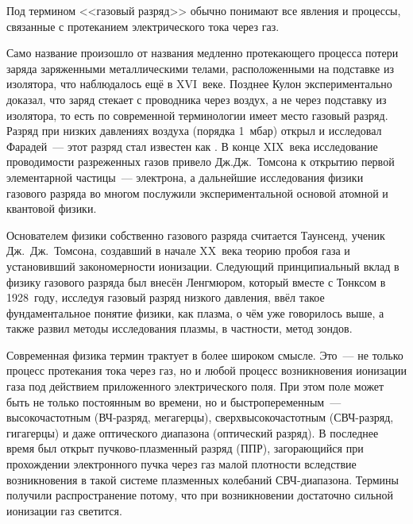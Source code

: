 

Под термином <<газовый разряд>> обычно понимают все явления и процессы, связанные с протеканием электрического тока
через газ.

Само название  произошло от названия медленно протекающего процесса потери заряда заряженными металлическими
телами, расположенными на подставке из изолятора, что наблюдалось ещё в XVI~веке. Позднее Кулон экспериментально
доказал, что заряд стекает с проводника через воздух, а не через подставку из изолятора, то есть по современной
терминологии имеет место газовый разряд. Разряд при низких давлениях воздуха (порядка 1~мбар) открыл и исследовал
Фарадей~--- этот разряд стал известен как . В конце XIX~века исследование проводимости разреженных газов
привело Дж.Дж.~Томсона к открытию первой элементарной частицы~--- электрона, а дальнейшие исследования физики газового
разряда во многом послужили экспериментальной основой атомной и квантовой физики.

Основателем физики собственно газового разряда считается Таунсенд, ученик Дж.~Дж.~Томсона, создавший в начале XX~века
теорию пробоя газа и установивший закономерности ионизации. Следующий принципиальный вклад в физику газового разряда был
внесён Ленгмюром, который вместе с Тонксом в 1928~году, исследуя газовый разряд низкого давления, ввёл такое
фундаментальное понятие физики, как плазма, о чём уже говорилось выше, а также развил методы исследования плазмы, в
частности, метод зондов.

Современная физика термин  трактует в более широком смысле. Это~--- не только процесс протекания
тока через газ, но и любой процесс возникновения ионизации газа под действием приложенного электрического поля. При этом
поле может быть не только постоянным во времени, но и быстропеременным~--- высокочастотным (ВЧ-разряд, мегагерцы),
сверхвысокочастотным (СВЧ-разряд, гигагерцы) и даже оптического диапазона (оптический разряд). В последнее время был
открыт пучково-плазменный разряд (ППР), загорающийся при прохождении электронного пучка через газ малой плотности
вследствие возникновения в такой системе плазменных колебаний СВЧ-диапазона. Термины 
получили распространение потому, что при возникновении достаточно сильной ионизации газ светится.

